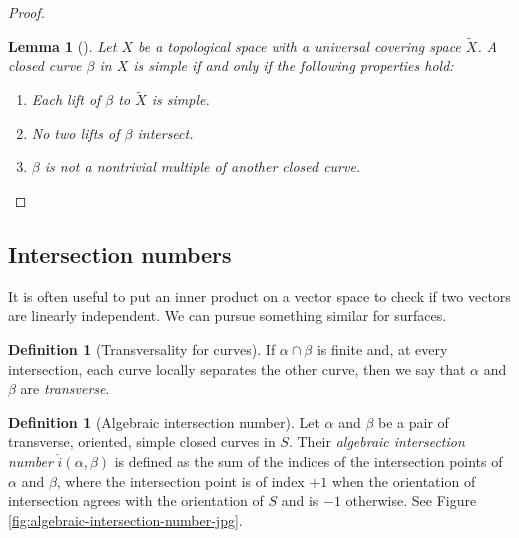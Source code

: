 \documentclass[reqno]{amsart}
\newtheorem{lemma}[theorem]{Lemma}
\theoremstyle{definition}
\newtheorem{definition}[theorem]{Definition}
\theoremstyle{remark}
\begin{document}
\begin{proof}
    \begin{lemma}[]\label{simple-loop-lifts}
        Let $X$ be a topological space with a universal covering space
         $\tilde{X}$. A closed curve $\beta$ in $X$ is simple if and
        only if the following properties hold:
        \begin{enumerate}
            \item Each lift of $\beta$ to $\tilde{X}$ is simple.
            \item No two lifts of $\beta$ intersect.
            \item  $\beta$ is not a nontrivial multiple of another closed
                curve.
         \end{enumerate}
    \end{lemma}

\end{proof}


\subsection{Intersection numbers}

It is often useful to put an inner product on a vector space to check
if two vectors are linearly independent. We can pursue something similar for
surfaces.


\begin{definition}[Transversality for curves]
If $\alpha \cap \beta$ is finite and, at every intersection, each
curve locally separates the other curve, then we say that
$\alpha$ and $\beta$ are \textit{transverse}.
\end{definition}

\begin{definition}[Algebraic intersection number]
    Let $\alpha$ and $\beta$ be a pair of transverse, oriented,
    simple closed curves in $S$. Their \textit{algebraic intersection
    number} $\hat{i}\left( \alpha,\beta \right) $ is
    defined as the sum of the indices
    of the intersection points of $\alpha$ and $\beta$,
    where the intersection point is of index $+1$ when the
    orientation of intersection agrees with
    the orientation of $S$ and is $-1$ otherwise. See
    Figure \ref{fig:algebraic-intersection-number-jpg}.
\end{definition}
\end{document}
